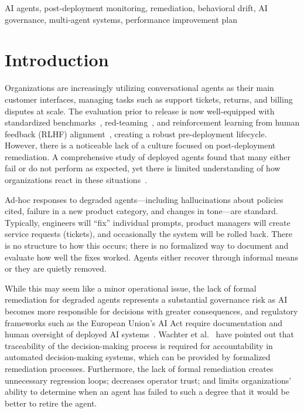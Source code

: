 \documentclass[conference]{IEEEtran}
\begin{document}
\begin{IEEEkeywords}
AI agents, post-deployment monitoring, remediation, behavioral drift,
AI governance, multi-agent systems, performance improvement plan
\end{IEEEkeywords}

\section{Introduction}
\label{sec:introduction}

Organizations are increasingly utilizing conversational agents as their main
customer interfaces, managing tasks such as support tickets, returns, and
billing disputes at scale. The evaluation prior to release is now well-equipped
with standardized benchmarks~\cite{liang2022holistic}, red-teaming~\cite{ganguli2022redteaming,perez2022redteaming},
and reinforcement learning from human feedback (RLHF)
alignment~\cite{ouyang2022instructions}, creating a robust pre-deployment
lifecycle. However, there is a noticeable lack of a culture focused on
post-deployment remediation. A comprehensive study of deployed agents found
that many either fail or do not perform as expected, yet there is limited
understanding of how organizations react in these situations~\cite{pan2025measuring}.

Ad-hoc responses to degraded agents---including hallucinations about policies
cited, failure in a new product category, and changes in tone---are standard.
Typically, engineers will ``fix'' individual prompts, product managers will
create service requests (tickets), and occasionally the system will be rolled
back. There is no structure to how this occurs; there is no formalized way to
document and evaluate how well the fixes worked. Agents either recover through
informal means or they are quietly removed.

While this may seem like a minor operational issue, the lack of formal
remediation for degraded agents represents a substantial governance risk as AI
becomes more responsible for decisions with greater consequences, and
regulatory frameworks such as the European Union's AI Act require documentation
and human oversight of deployed AI systems~\cite{eu2024aiact}. Wachter et
al.~\cite{wachter2017counterfactual} have pointed out that traceability of the
decision-making process is required for accountability in automated decision-making
systems, which can be provided by formalized remediation processes. Furthermore, the
lack of formal remediation creates unnecessary regression loops; decreases
operator trust; and limits organizations' ability to determine when an agent
has failed to such a degree that it would be better to retire the agent.
\end{document}
